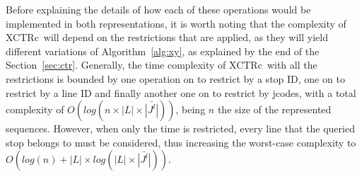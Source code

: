\documentclass[runningheads]{llncs}
\newcommand{\ctrq}{XCTRc}
\begin{document}
\medskip
Before explaining the details of how each of these operations would be implemented in both representations, it is worth noting that the complexity of \ctrq~will depend on the restrictions that are applied, as they will yield different variations of Algorithm~\ref{alg:xy}, as explained by the end of the Section~\ref{sec:ctr}. Generally, the time complexity of \ctrq~with all the restrictions is bounded by one  operation on  to restrict by a stop ID, one on  to restrict by a line ID and finally another one on  to restrict by jcodes, with a total complexity of $O(log(n\times|L|\times\bar{|J^l|}))$, being $n$ the size of the represented sequences. However, when only the time is restricted, every line that the queried stop belongs to must be considered, thus increasing the worst-case complexity to $O(log(n) + |L|\times log(|L|\times\bar{|J^l|}))$.
\end{document}
